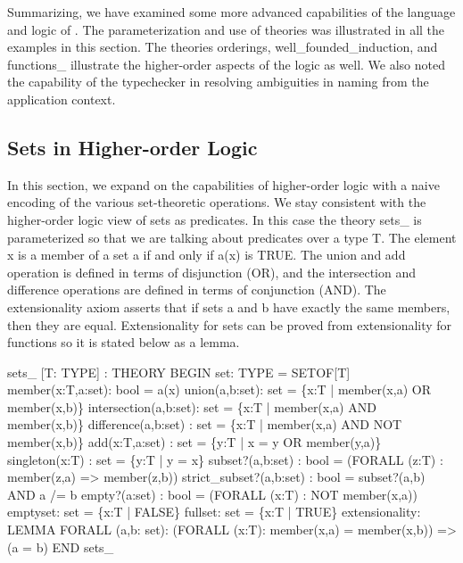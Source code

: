 Summarizing, we have examined some more advanced capabilities of the
language and logic of \pvs\@.  The parameterization and use of
theories was illustrated in all the examples in this section.  The
theories {\stt orderings}, {\stt well\_founded\_induction}, and {\stt
functions\_} illustrate the higher-order aspects of the logic as well.
We also noted the capability of the typechecker in resolving
ambiguities in naming from the application context.

\subsection{Sets in Higher-order Logic}
\label{sets-in-hol}

In this section, we expand on the capabilities of higher-order logic
with a naive encoding of the various set-theoretic operations.  We
stay consistent with the higher-order logic view of sets as predicates.
In this case the theory {\stt sets\_} is parameterized so that we are
talking about predicates over a type {\stt T}.  The element {\stt x} is a
member of a set {\stt a} if and only if {\stt a(x)} is {\stt TRUE}.  The
{\stt union} and {\stt add} operation is defined in terms of disjunction
({\stt OR}), and the intersection and difference operations are defined
in terms of conjunction ({\stt AND}).  The extensionality axiom asserts
that if sets {\stt a} and {\stt b} have exactly the same members, then
they are equal.  Extensionality for sets can be proved from
extensionality for functions so it is stated below as a lemma.
\begin{pvsex}
  sets\_ [T: TYPE] : THEORY
   BEGIN
    set: TYPE = SETOF[T]
    member(x:T,a:set): bool = a(x)
    union(a,b:set): set = \{x:T | member(x,a) OR member(x,b)\}
    intersection(a,b:set): set = \{x:T | member(x,a) AND member(x,b)\}
    difference(a,b:set) : set = \{x:T | member(x,a) AND NOT member(x,b)\}
    add(x:T,a:set) : set = \{y:T | x = y OR member(y,a)\}
    singleton(x:T) : set = \{y:T | y = x\}
    subset?(a,b:set) : bool = (FORALL (z:T) : member(z,a) => member(z,b))
    strict\_subset?(a,b:set) : bool = subset?(a,b) AND a /= b
    empty?(a:set) : bool = (FORALL (x:T) : NOT member(x,a))
    emptyset: set = \{x:T | FALSE\}
    fullset: set = \{x:T | TRUE\}
    extensionality: LEMMA
      FORALL (a,b: set):
        (FORALL (x:T): member(x,a) = member(x,b)) => (a = b)
   END sets\_
\end{pvsex}

